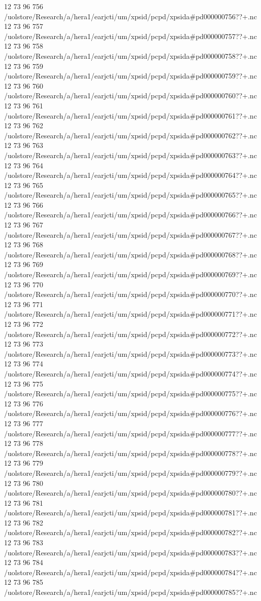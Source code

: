 12 73 96
756
/uolstore/Research/a/hera1/earjcti/um/xpsid/pcpd/xpsida#pd000000756??+.nc
12 73 96
757
/uolstore/Research/a/hera1/earjcti/um/xpsid/pcpd/xpsida#pd000000757??+.nc
12 73 96
758
/uolstore/Research/a/hera1/earjcti/um/xpsid/pcpd/xpsida#pd000000758??+.nc
12 73 96
759
/uolstore/Research/a/hera1/earjcti/um/xpsid/pcpd/xpsida#pd000000759??+.nc
12 73 96
760
/uolstore/Research/a/hera1/earjcti/um/xpsid/pcpd/xpsida#pd000000760??+.nc
12 73 96
761
/uolstore/Research/a/hera1/earjcti/um/xpsid/pcpd/xpsida#pd000000761??+.nc
12 73 96
762
/uolstore/Research/a/hera1/earjcti/um/xpsid/pcpd/xpsida#pd000000762??+.nc
12 73 96
763
/uolstore/Research/a/hera1/earjcti/um/xpsid/pcpd/xpsida#pd000000763??+.nc
12 73 96
764
/uolstore/Research/a/hera1/earjcti/um/xpsid/pcpd/xpsida#pd000000764??+.nc
12 73 96
765
/uolstore/Research/a/hera1/earjcti/um/xpsid/pcpd/xpsida#pd000000765??+.nc
12 73 96
766
/uolstore/Research/a/hera1/earjcti/um/xpsid/pcpd/xpsida#pd000000766??+.nc
12 73 96
767
/uolstore/Research/a/hera1/earjcti/um/xpsid/pcpd/xpsida#pd000000767??+.nc
12 73 96
768
/uolstore/Research/a/hera1/earjcti/um/xpsid/pcpd/xpsida#pd000000768??+.nc
12 73 96
769
/uolstore/Research/a/hera1/earjcti/um/xpsid/pcpd/xpsida#pd000000769??+.nc
12 73 96
770
/uolstore/Research/a/hera1/earjcti/um/xpsid/pcpd/xpsida#pd000000770??+.nc
12 73 96
771
/uolstore/Research/a/hera1/earjcti/um/xpsid/pcpd/xpsida#pd000000771??+.nc
12 73 96
772
/uolstore/Research/a/hera1/earjcti/um/xpsid/pcpd/xpsida#pd000000772??+.nc
12 73 96
773
/uolstore/Research/a/hera1/earjcti/um/xpsid/pcpd/xpsida#pd000000773??+.nc
12 73 96
774
/uolstore/Research/a/hera1/earjcti/um/xpsid/pcpd/xpsida#pd000000774??+.nc
12 73 96
775
/uolstore/Research/a/hera1/earjcti/um/xpsid/pcpd/xpsida#pd000000775??+.nc
12 73 96
776
/uolstore/Research/a/hera1/earjcti/um/xpsid/pcpd/xpsida#pd000000776??+.nc
12 73 96
777
/uolstore/Research/a/hera1/earjcti/um/xpsid/pcpd/xpsida#pd000000777??+.nc
12 73 96
778
/uolstore/Research/a/hera1/earjcti/um/xpsid/pcpd/xpsida#pd000000778??+.nc
12 73 96
779
/uolstore/Research/a/hera1/earjcti/um/xpsid/pcpd/xpsida#pd000000779??+.nc
12 73 96
780
/uolstore/Research/a/hera1/earjcti/um/xpsid/pcpd/xpsida#pd000000780??+.nc
12 73 96
781
/uolstore/Research/a/hera1/earjcti/um/xpsid/pcpd/xpsida#pd000000781??+.nc
12 73 96
782
/uolstore/Research/a/hera1/earjcti/um/xpsid/pcpd/xpsida#pd000000782??+.nc
12 73 96
783
/uolstore/Research/a/hera1/earjcti/um/xpsid/pcpd/xpsida#pd000000783??+.nc
12 73 96
784
/uolstore/Research/a/hera1/earjcti/um/xpsid/pcpd/xpsida#pd000000784??+.nc
12 73 96
785
/uolstore/Research/a/hera1/earjcti/um/xpsid/pcpd/xpsida#pd000000785??+.nc

